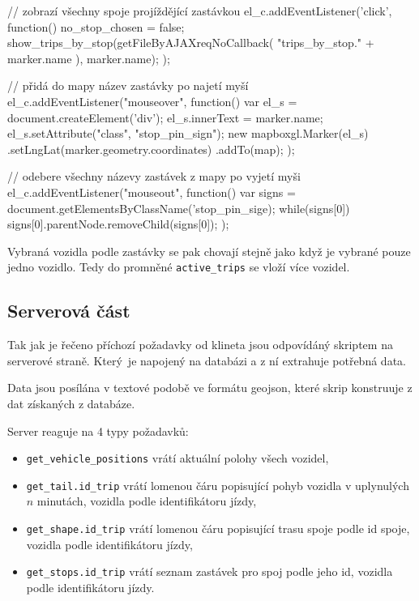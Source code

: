 \begin{code}[frame=none]
// zobrazí všechny spoje projíždějící zastávkou
el_c.addEventListener('click', function() {
  no_stop_chosen = false;
  show_trips_by_stop(getFileByAJAXreqNoCallback(
    "trips_by_stop." + marker.name
  ), marker.name);
});

// přidá do mapy název zastávky po najetí myší
el_c.addEventListener("mouseover", function(){
  var el_s = document.createElement('div');
  el_s.innerText = marker.name;
  el_s.setAttribute("class", "stop_pin_sign");
  new mapboxgl.Marker(el_s)
    .setLngLat(marker.geometry.coordinates)
    .addTo(map);
});

// odebere všechny názevy zastávek z mapy po vyjetí myši
el_c.addEventListener("mouseout", function(){
  var signs = document.getElementsByClassName('stop_pin_sige);
  while(signs[0]) {
    signs[0].parentNode.removeChild(signs[0]);
  }
});
\end{code}

Vybraná vozidla podle zastávky se pak chovají stejně jako když je vybrané pouze jedno vozidlo. Tedy do promněné \verb-active_trips- se vloží více vozidel.

\subsection{Serverová část}

Tak jak je řečeno příchozí požadavky od klineta jsou odpovídáný skriptem na serverové straně. Který je napojený na databázi a z ní extrahuje potřebná data.

\bigbreak

Data jsou posílána v textové podobě ve formátu \gls{geojson}, které skrip konstruuje z dat získaných z databáze.

\bigbreak

Server reaguje na 4 typy požadavků:

\begin{itemize}
	\item \verb-get_vehicle_positions- vrátí aktuální polohy všech vozidel,

	\item \verb-get_tail.id_trip- vrátí lomenou čáru popisující pohyb vozidla v uplynulých $n$ minutách, vozidla podle identifikátoru jízdy,

	\item \verb-get_shape.id_trip- vrátí lomenou čáru popisující trasu spoje podle id spoje, vozidla podle identifikátoru jízdy,

	\item \verb-get_stops.id_trip- vrátí seznam zastávek pro spoj podle jeho id, vozidla podle identifikátoru jízdy.
\end{itemize}

